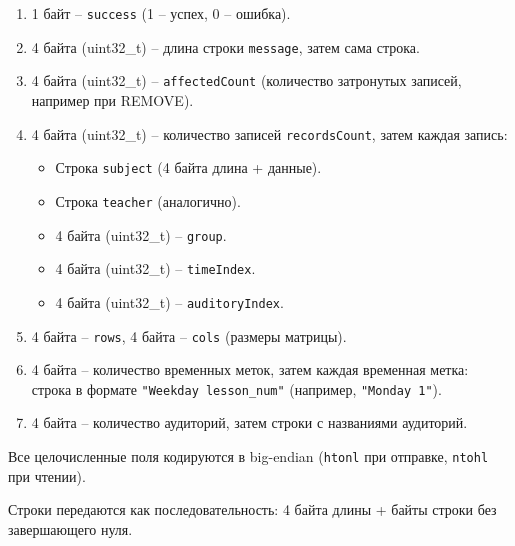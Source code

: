 \documentclass[12pt,a4paper]{article}
\begin{document}
\begin{enumerate}
  \item 1 байт – \texttt{success} (1 – успех, 0 – ошибка).
  \item 4 байта (uint32\_t) – длина строки \texttt{message}, затем сама строка.
  \item 4 байта (uint32\_t) – \texttt{affectedCount} (количество затронутых записей, например при REMOVE).
  \item 4 байта (uint32\_t) – количество записей \texttt{recordsCount}, затем каждая запись:
  \begin{itemize}
    \item Строка \texttt{subject} (4 байта длина + данные).
    \item Строка \texttt{teacher} (аналогично).
    \item 4 байта (uint32\_t) – \texttt{group}.
    \item 4 байта (uint32\_t) – \texttt{timeIndex}.
    \item 4 байта (uint32\_t) – \texttt{auditoryIndex}.
  \end{itemize}
  \item 4 байта – \texttt{rows}, 4 байта – \texttt{cols} (размеры матрицы).
  \item 4 байта – количество временных меток, затем каждая временная метка: строка в формате \texttt{"Weekday lesson\_num"} (например, \texttt{"Monday 1"}).
  \item 4 байта – количество аудиторий, затем строки с названиями аудиторий.
\end{enumerate}

Все целочисленные поля кодируются в big-endian (\texttt{htonl} при отправке, \texttt{ntohl} при чтении).

Строки передаются как последовательность: 4 байта длины + байты строки без завершающего нуля.
\end{document}
